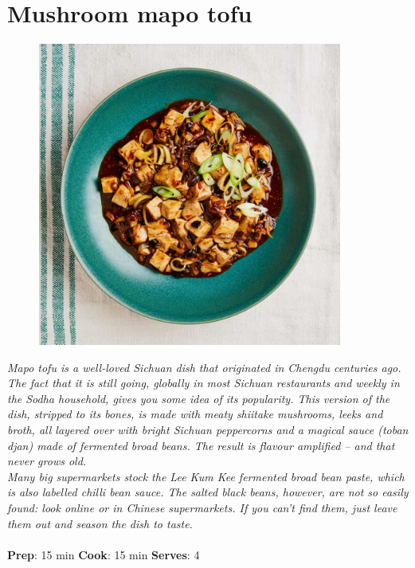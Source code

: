 \documentclass{book}
\begin{document}
\section{Mushroom mapo tofu}
\begin{figure}
\centering\includegraphics[width=10cm,height=10cm,keepaspectratio]{Recipe_Pictures/Mushroom_mapo_tofu.png}
\end{figure}
\emph{Mapo tofu is a well-loved Sichuan dish that originated in Chengdu centuries ago. The fact that it is still going, globally in most Sichuan restaurants and weekly in the Sodha household, gives you some idea of its popularity. This version of the dish, stripped to its bones, is made with meaty shiitake mushrooms, leeks and broth, all layered over with bright Sichuan peppercorns and a magical sauce (toban djan) made of fermented broad beans. The result is flavour amplified – and that never grows old.\\ 
Many big supermarkets stock the Lee Kum Kee fermented broad bean paste, which is also labelled chilli bean sauce. The salted black beans, however, are not so easily found: look online or in Chinese supermarkets. If you can’t find them, just leave them out and season the dish to taste.}\\\\ 
\textbf{Prep}: 15 min
\textbf{Cook}: 15 min
\textbf{Serves}: 4
\end{document}

